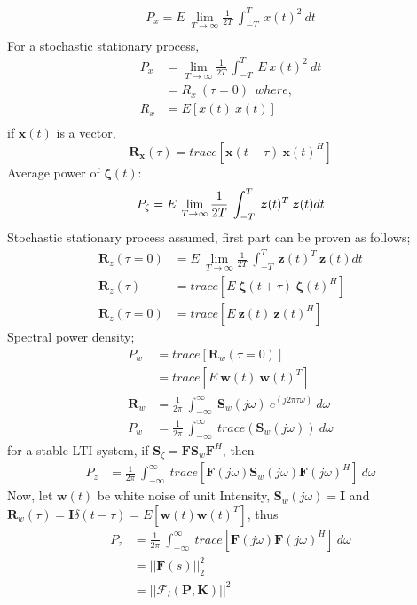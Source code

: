 \documentclass{scrreprt}
\begin{document}
\begin{align*}
P_x = E\:\lim_{T\to\infty} \frac{1}{2T}\:\int_{-T}^T\: x(t)^2\:dt \\
\end{align*}
For a stochastic stationary process,
\begin{align*}
P_x &= \lim_{T\to\infty} \frac{1}{2T}\:\int_{-T}^T\: E\:x(t)^2\:dt \\
	&= R_x\:(\tau=0) \ \ where,\\
R_x &= E[x(t)\:\bar{x}(t)] \\
\end{align*}
if $\bm{x}(t)$ is a vector,
\begin{equation}
\bm{R_x}(\tau) = trace[\bm{x}(t + \tau)\: \bm{x}(t)^H]
\end{equation}
Average power of $\bm{\zeta}(t)$:
\begin{equation}
P_{\zeta} = E\:\lim_{T\to\infty} \frac{1}{2T}\:\int_{-T}^T\: \bm{z}(t)^T\: \bm{z}(t)dt \\
\end{equation}
Stochastic stationary process assumed, first part can be proven as follows;
\begin{align*}
\bm{R}_{z}(\tau=0) &= E\:\lim_{T\to\infty} \frac{1}{2T}\:\int_{-T}^T\: \bm{z}(t)^T\: \bm{z}(t)dt \\
\bm{R}_{z}(\tau) &= trace[E\:\bm{\zeta}(t + \tau)\: \bm{\zeta}(t)^H] \\
\bm{R}_{z}(\tau=0) &= trace[E\:\bm{z}(t)\: \bm{z}(t)^H]
\end{align*}
Spectral power density;
\begin{align*}
P_w &= trace[\bm{R}_w(\tau=0)] \\
	&= trace[E\:\bm{w}(t)\: \bm{w}(t)^T] \\
\bm{R}_w &= \frac{1}{2\pi}\: \int_{-\infty}^{\infty}\: \bm{S}_w(j\omega)\: e^{(j2\pi\tau\omega)}\:d\omega \\
P_w &= \frac{1}{2\pi}\: \int_{-\infty}^{\infty}\: trace(\bm{S}_w(j\omega))\: d\omega
\end{align*}
for a stable LTI system, if $\bm{S}_{\zeta}=\bm{F}\bm{S}_w\bm{F}^H$, then
\begin{align*}
P_z &= \frac{1}{2\pi}\: \int_{-\infty}^{\infty}\: trace[\bm{F}(j\omega)\bm{S}_w(j\omega)\bm{F}(j\omega)^H]\: d\omega
\end{align*}
Now, let $\bm{w}(t)$ be white noise of unit Intensity, $\bm{S}_w(j\omega)=\bm{I}$ and \\
$\bm{R}_w(\tau)= \bm{I}\delta(t - \tau)=E[\bm{w}(t)\bm{w}(t)^T]$, thus
\begin{align*}
P_z &= \frac{1}{2\pi}\: \int_{-\infty}^{\infty}\: trace[\bm{F}(j\omega)\bm{F}(j\omega)^H]\: d\omega \\
	&= ||\bm{F}(s)||_2^2 \\
	&= ||\mathcal{F}_l(\bm{P},\bm{K})||^2
\end{align*}
\end{document}
